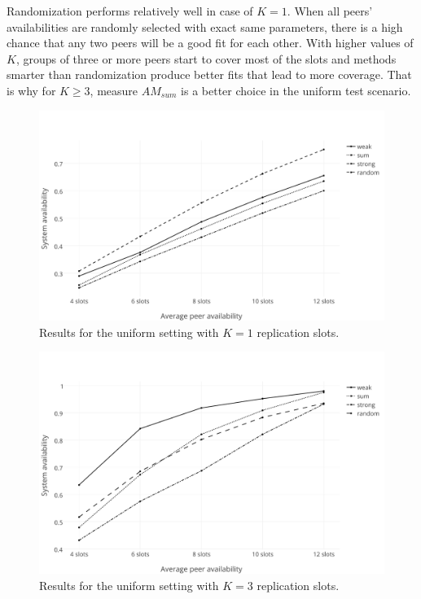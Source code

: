 \documentclass{pracamgren}
\begin{document}
Randomization performs relatively well in case of $K=1$. When all peers' availabilities are randomly selected with exact same parameters, there is a high chance that any two peers will be a good fit for each other. With higher values of $K$, groups of three or more peers start to cover most of the slots and methods smarter than randomization produce better fits that lead to more coverage. That is why for $K\geqslant3$, measure $AM_{sum}$ is a better choice in the uniform test scenario.\\

\begin{figure}[h]
\centering
\includegraphics[scale=0.5]{graphs/uniform_1.pdf}
\caption{Results for the uniform setting with $K=1$ replication slots.}
\label{uniform_1}
\end{figure}

\begin{figure}[h]
\centering
\includegraphics[scale=0.5]{graphs/uniform_3.pdf}
\caption{Results for the uniform setting with $K=3$ replication slots.}
\label{uniform_3}
\end{figure}
\end{document}
